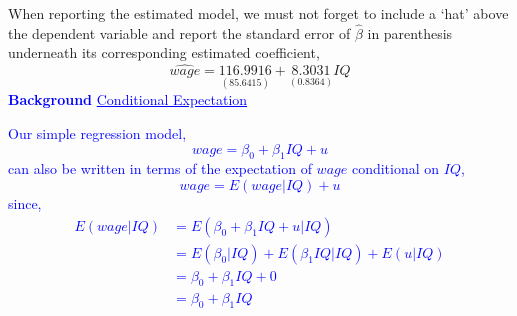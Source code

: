 \documentclass[12pt]{report}
\newenvironment{blueframed}[1][blue]
{\def\FrameCommand{\fboxsep=\FrameSep\fcolorbox{#1}{white}}%
\MakeFramed {\advance\hsize-\width \FrameRestore}}
{\endMakeFramed}
\begin{document}
\vspace{-\baselineskip}
\noindent When reporting the estimated model, we must not forget to include a `hat' above the dependent variable and report the standard error of $\hat{\beta}$ in parenthesis underneath its corresponding estimated coefficient,
$$\widehat{wage} = \underset{(85.6415)}{116.9916} + \underset{(0.8364)}{8.3031}IQ$$
\justify
\begin{blueframed}
	\textcolor{blue}{\textbf{Background}}
	\vspace{-\baselineskip}
	\justify
	\textcolor{blue}{\underline{Conditional Expectation}}
	
	\noindent \textcolor{blue}
	{
	Our simple regression model,
	$$wage = \beta_0+\beta_1IQ+u$$
	can also be written in terms of the expectation of $wage$ conditional on $IQ$,
	$$wage = E(wage|IQ)+u$$ 
	since,
	\begin{align*}
		E(wage|IQ) &= E(\beta_0+\beta_1IQ+u|IQ) \\
		&= E(\beta_0|IQ) + E(\beta_1IQ|IQ) + E(u|IQ) \\ 
		&= \beta_0 + \beta_1 IQ + 0 \\ &= \beta_0 + \beta_1 IQ
	\end{align*}}
\end{blueframed}
\end{document}
